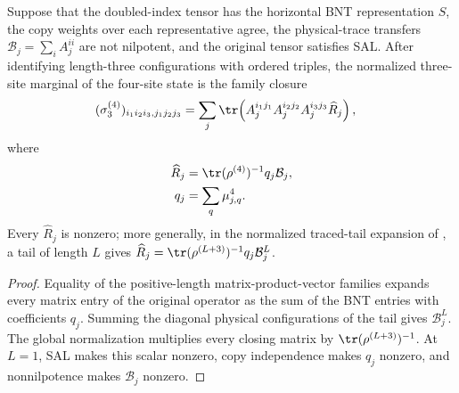 \begin{lemma}
    \label{thm:mpdo_normalized_three_site_bnt_family_closure}
    \leanok
    Suppose that the doubled-index tensor has the horizontal BNT
    representation $S$, the copy weights over each representative agree, the
    physical-trace transfers
    $\mathcal B_j=\sum_iA_j^{ii}$ are not nilpotent, and the original tensor
    satisfies SAL. After identifying length-three configurations with
    ordered triples, the normalized three-site marginal of the four-site
    state is the family closure
    \begin{align}
        (\sigma^{(4)}_3)_{i_1i_2i_3,j_1j_2j_3}
         & =\sum_j\tr\!\left(A_j^{i_1j_1}A_j^{i_2j_2}A_j^{i_3j_3}\widehat R_j\right),
        \notag
    \end{align}
    where
    \begin{align}
        \widehat R_j
            & =\tr(\rho^{(4)})^{-1}q_j\mathcal B_j,
        \notag                                      \\
        q_j & =\sum_q\mu_{j,q}^{4}.
        \notag
    \end{align}
    Every $\widehat R_j$ is nonzero; more generally, in the normalized
    traced-tail expansion of
    \cite[Appendix~C.2, lines~1714--1732]{Cirac2016MPDO_arXiv}, a tail of length
    $L$ gives $\widehat R_j=\tr(\rho^{(L+3)})^{-1}q_j\mathcal B_j^L$.
\end{lemma}

\begin{proof}\leanok
    Equality of the positive-length matrix-product-vector families expands every
    matrix entry of the original operator as the sum of the BNT entries with
    coefficients $q_j$. Summing the diagonal physical configurations of the
    tail gives $\mathcal B_j^L$. The global normalization multiplies every
    closing matrix by $\tr(\rho^{(L+3)})^{-1}$. At $L=1$, SAL makes this
    scalar nonzero, copy independence makes $q_j$ nonzero, and
    nonnilpotence makes $\mathcal B_j$ nonzero.
\end{proof}

